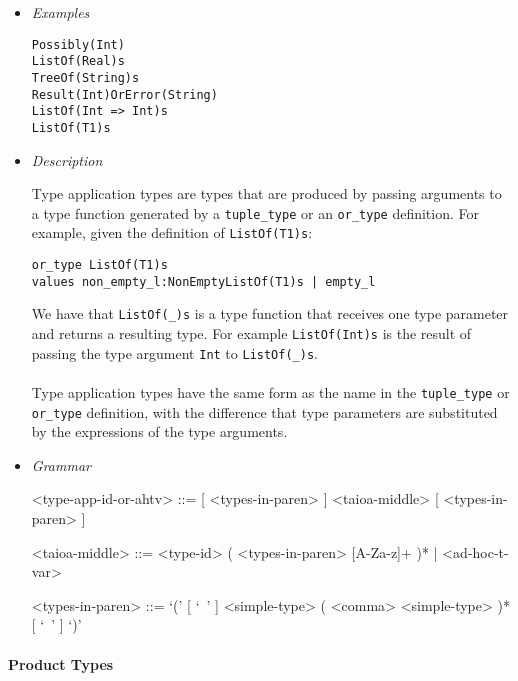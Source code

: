 \documentclass{article}
\begin{document}
\begin{itemize}
\item \textit{Examples}
\begin{verbatim}
Possibly(Int)
ListOf(Real)s
TreeOf(String)s
Result(Int)OrError(String)
ListOf(Int => Int)s
ListOf(T1)s
\end{verbatim}

\item \textit{Description}

Type application types are types that are produced by passing arguments
to a type function generated by a \verb|tuple_type| or an \verb|or_type|
definition. For example, given the definition of \verb|ListOf(T1)s|:
\begin{verbatim}
or_type ListOf(T1)s
values non_empty_l:NonEmptyListOf(T1)s | empty_l
\end{verbatim}
We have that \verb|ListOf(_)s| is a type function that receives one type
parameter and returns a resulting type. For example \verb|ListOf(Int)s| is
the result of passing the type argument \verb|Int| to \verb|ListOf(_)s|.
\\\\
Type application types have the same form as the name in the
\verb|tuple_type| or \verb|or_type| definition, with the difference that
type parameters are substituted by the expressions of the type arguments.

\item \textit{Grammar}
\begin{grammar}
<type-app-id-or-ahtv> ::=
[ <types-in-paren> ] <taioa-middle> [ <types-in-paren> ]

<taioa-middle> ::=
<type-id> ( <types-in-paren> [A-Za-z]+ )* | <ad-hoc-t-var>

<types-in-paren> ::=
`(' [ `\ ' ] <simple-type> ( <comma> <simple-type> )* [ `\ ' ] `)'
\end{grammar}
\end{itemize}

\newpage

\paragraph{Product Types}
\end{document}
